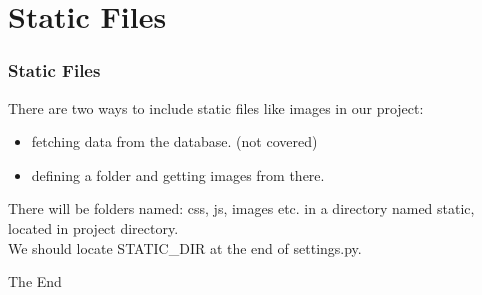 \documentclass{beamer}
\begin{document}
\section{Static Files}

\begin{frame}
	\frametitle{Static Files}
	There are two ways to include static files like images in our project:
	\begin{itemize}
		\item fetching data from the database. (not covered)
		\item defining a folder and getting images from there.
	\end{itemize}
	There will be folders named: css, js, images etc. in a directory named static, located in project directory.
	\\We should locate STATIC\_DIR at the end of settings.py.
\end{frame}

\begin{frame}
\Huge{\centerline{The End}}
\end{frame}
\end{document}
